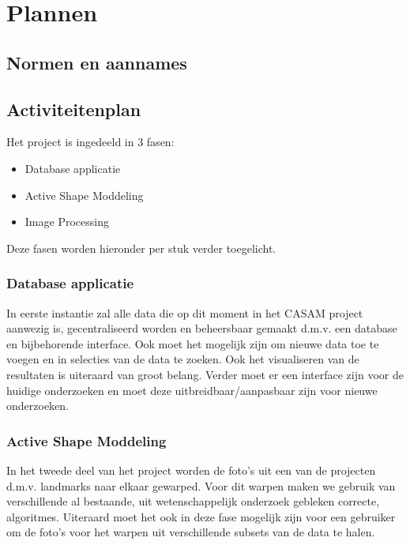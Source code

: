 \section{Plannen}

\subsection{Normen en aannames}

\subsection{Activiteitenplan}
Het project is ingedeeld in 3 fasen:
\begin{itemize}
	\item Database applicatie
	\item Active Shape Moddeling
	\item Image Processing
\end{itemize}
Deze fasen worden hieronder per stuk verder toegelicht.

\subsubsection{Database applicatie}
In eerste instantie zal alle data die op dit moment in het CASAM project aanwezig is, gecentraliseerd worden en beheersbaar gemaakt d.m.v. een database en bijbehorende interface. 
Ook moet het mogelijk zijn om nieuwe data toe te voegen en in selecties van de data te zoeken. 
Ook het visualiseren van de resultaten is uiteraard van groot belang. 
Verder moet er een interface zijn voor de huidige onderzoeken en moet deze uitbreidbaar/aanpasbaar zijn voor nieuwe onderzoeken.

\subsubsection{Active Shape Moddeling}
In het tweede deel van het project worden de foto's uit een van de projecten d.m.v. landmarks naar elkaar gewarped. 
Voor dit warpen maken we gebruik van verschillende al bestaande, uit wetenschappelijk onderzoek gebleken correcte, algoritmes.
Uiteraard moet het ook in deze fase mogelijk zijn voor een gebruiker om de foto's voor het warpen uit verschillende subsets van de data te halen.

